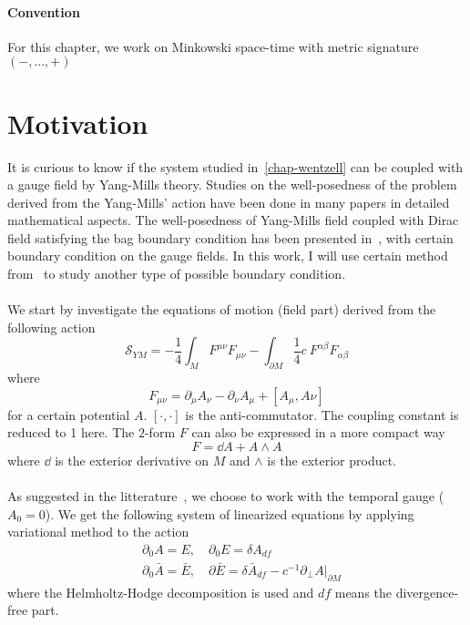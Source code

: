 \paragraph{Convention} 
For this chapter, we work on Minkowski space-time with metric signature $(-, \ldots, +)$
\section{Motivation}
It is curious to know if the system studied in~\cref{chap-wentzell} can be coupled with a gauge field by Yang-Mills theory. 
Studies on the well-posedness of the problem derived from the Yang-Mills' action have been done in many papers in detailed mathematical aspects. 
The well-posedness of Yang-Mills field coupled with Dirac field satisfying the bag boundary condition has been presented in~\cite{Sinatycki1993}, with certain boundary condition on the gauge fields.
In this work, I will use certain method from~\cite{Sinatycki1993} to study another type of possible boundary condition. \\\\
%
We start by investigate the equations of motion (field part) derived from the following action
\begin{equation}\label{ym-action}
\mathcal{S}_{YM} = -\frac 1 4 \int_M F^{\mu\nu} F_{\mu\nu} 
-\int_{\partial M} \frac 1 4 c\ F^{\alpha\beta} F_{\alpha\beta}
\end{equation}
where 
\begin{equation*}
F_{\mu\nu} = \partial_\mu A_\nu - \partial_\nu A_\mu + [A_\mu, A\nu]
\end{equation*}
for a certain potential $A$. $[\cdot, \cdot]$ is the anti-commutator. The coupling constant is reduced to 1 here. The $2$-form $F$ can also be expressed in a more compact way
\begin{equation*}
F = \dd A + A \wedge A
\end{equation*}
where $\dd$ is the exterior derivative on $M$ and $\wedge$ is the exterior product.\\\\
As suggested in the litterature~\cite{Tao2003}, 
we choose to work with the temporal gauge ($A_0 = 0$). 
We get the following system of linearized equations by applying variational method to the action
\begin{equation}
\begin{split}
& \partial_0 A = E, \quad \partial_0 E = \delta A_{df} \\
& \partial_0 \bar{A} = \bar{E} , \quad \partial \bar{E} = \delta \bar{A}_{df} - c^{-1}\partial_\bot A\vert_{\partial M}
\end{split}
\end{equation}
where the Helmholtz-Hodge decomposition is used and $df$ means the divergence-free part.
